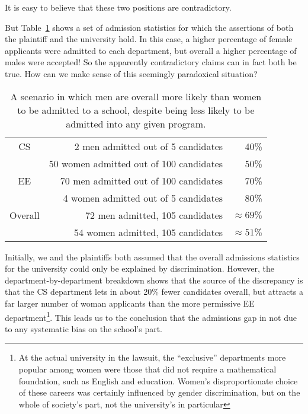 It is easy to believe that these two positions are contradictory.
\iffalse
In fact, this situation is an instance of what is known as
\term{Simpson's Paradox}.
\fi
But Table~\ref{fig:15D3} shows a set of admission statistics for which
the assertions of both the plaintiff and the university hold.  In this
case, a higher percentage of female applicants were admitted to each
department, but overall a higher percentage of males were accepted!
So the apparently contradictory claims can in fact both be true.  How
can we make sense of this seemingly paradoxical situation?

\begin{table}

\begin{tabular}{crr}
CS & 2 men admitted out of 5 candidates      &   40\% \\
   & 50 women admitted out of 100 candidates     &  50\% \\
EE & 70 men admitted out of 100 candidates   &  70\% \\
   & 4 women admitted out of 5 candidates         & 80\% \\
\hline
Overall & 72 men admitted, 105 candidates & $\approx 69\%$ \\
        & 54 women admitted, 105 candidates   & $\approx 51\%$
\end{tabular}

\caption{A scenario in which men are overall more likely than women to
  be admitted to a school, despite being less likely to be admitted
  into any given program.}

\label{fig:15D3}

\end{table}

Initially, we and the plaintiffs both assumed that the overall
admissions statistics for the university could only be explained by
discrimination.  However, the department-by-department breakdown shows
that the source of the discrepancy is that the CS department lets in
about 20\% fewer candidates overall, but attracts a far larger number
of woman applicants than the more permissive EE department\footnote{At
  the actual university in the lawsuit, the ``exclusive'' departments
  more popular among women were those that did not require a
  mathematical foundation, such as English and education.  Women's
  disproportionate choice of these careers was certainly influenced by
  gender discrimination, but on the whole of society's part, not the
  university's in particular}.  This leads us to the conclusion that
the admissions gap in not due to any systematic bias on the school's
part.

